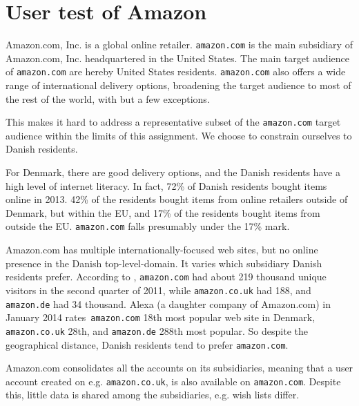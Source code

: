 
\section{User test of Amazon}

Amazon.com, Inc. is a global online retailer. \texttt{amazon.com} is the main
subsidiary of Amazon.com, Inc. headquartered in the United States. The main
target audience of \texttt{amazon.com} are hereby United States residents.
\texttt{amazon.com} also offers a wide range of international delivery options,
broadening the target audience to most of the rest of the world, with but a few
exceptions.

This makes it hard to address a representative subset of the
\texttt{amazon.com} target audience within the limits of this assignment. We
choose to constrain ourselves to Danish residents.

For Denmark, there are good delivery options\footnotemark, and the Danish
residents have a high level of internet literacy\cite{bebrit02}. In fact, 72\%
of Danish residents bought items online in 2013\cite{bebrit07}. 42\% of the
residents bought items from online retailers outside of Denmark, but within the
EU, and 17\% of the residents bought items from outside the EU\cite{bebrit11}.
\texttt{amazon.com} falls presumably under the 17\% mark.


Amazon.com has multiple internationally-focused web sites, but no online
presence in the Danish top-level-domain. It varies which subsidiary Danish
residents prefer. According to \cite[FDIM Top 1000]{brug-2012},
\texttt{amazon.com} had about 219 thousand unique visitors in the second
quarter of 2011, while \texttt{amazon.co.uk} had 188, and \texttt{amazon.de}
had 34 thousand. Alexa (a daughter company of Amazon.com) in January 2014
rates\footnotemark~\texttt{amazon.com} 18th most popular web site in Denmark,
\texttt{amazon.co.uk} 28th, and \texttt{amazon.de} 288th most popular. So
despite the geographical distance, Danish residents tend to prefer
\texttt{amazon.com}.


Amazon.com consolidates all the accounts on its subsidiaries, meaning that a
user account created on e.g. \texttt{amazon.co.uk}, is also available on
\texttt{amazon.com}. Despite this, little data is shared among the
subsidiaries, e.g. wish lists differ.

